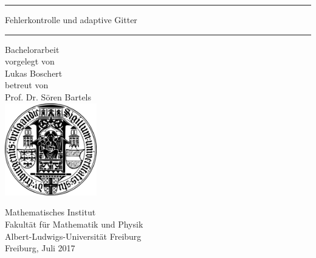 \thispagestyle{empty}
\mbox{}
\begin{center}
\vspace*{2cm}
\hrule \vspace*{4mm}
{\huge \textsf{Fehlerkontrolle und adaptive Gitter}} \\[3mm]
\hrule \vspace*{3cm}
{\sc \huge Bachelorarbeit} \\[1cm]
vorgelegt von \\[.5cm]
{\Large Lukas Boschert} \\[1cm]
betreut von \\[.5cm]
{\Large Prof. Dr. S\"oren Bartels} \\[1.5cm]
\includegraphics[width=4cm]{pics/alu-wappen}

\bigskip

{\sc Mathematisches Institut} \\
{\sc Fakult\"at f\"ur Mathematik und Physik} \\
{\sc Albert-Ludwigs-Universit\"at Freiburg} \\[1cm]
{\Large Freiburg, Juli 2017}

\end{center}
\mbox{}

\newpage
\thispagestyle{empty}
\mbox{}

